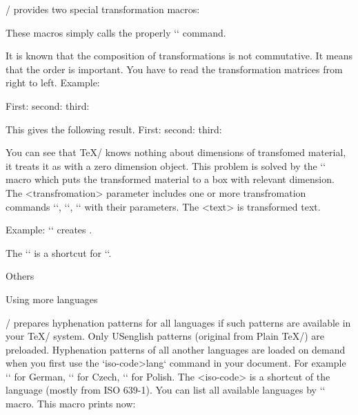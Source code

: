 {\OpTeX/ provides two special transformation macros:

\begtt
{} 
\endtt 

These macros simply calls the properly `\pdfsetmatrix` command.

It is known that the composition of transformations is not commutative. It
means that the order is important. You have to read the transformation
matrices from right to left. Example:

\begtt
First: \pdfsave {}\pdfrestore
second: \pdfsave {}\pdfrestore
third: \pdfsave {}%
       \pdfrestore %
\endtt
%
\par\nobreak\bigskip\smallskip
This gives the following result. 
First: \pdfsave {}\pdfrestore
second: \pdfsave {}\pdfrestore
third: \pdfsave {}\pdfrestore
\par\nobreak\bigskip{}%

You can see that \TeX/ knows nothing about dimensions of transfomed material,
it treats it as with a zero dimension object. 
This problem is solved by the `` 
macro which puts the transformed
material to a box with relevant dimension. The <transfromation> parameter
includes one or more transfromation commands `\pdfsetmatrix`, `\pdfscale`,
`\pdfrotate` with their parameters. The <text> is transformed text.

Example: ``
creates .

The `` is a shortcut for 
``.


\sec Others

\secc[lang] Using more languages

\OpTeX/ prepares hyphenation patterns for all languages if such patterns are
available in your \TeX/ system. 
\new
Only USenglish patterns (original from Plain \TeX/) are preloaded.
Hyphenation patterns of all another languages are loaded on demand when you first use
the `\<iso-code>lang` command in your document. 
For example `\delang` for German, `\cslang` for
Czech, `\pllang` for Polish. The <iso-code> is a shortcut 
of the language (mostly from ISO 639-1). 
You can list all available languages by `\langlist` 
macro. This macro prints now:

}
